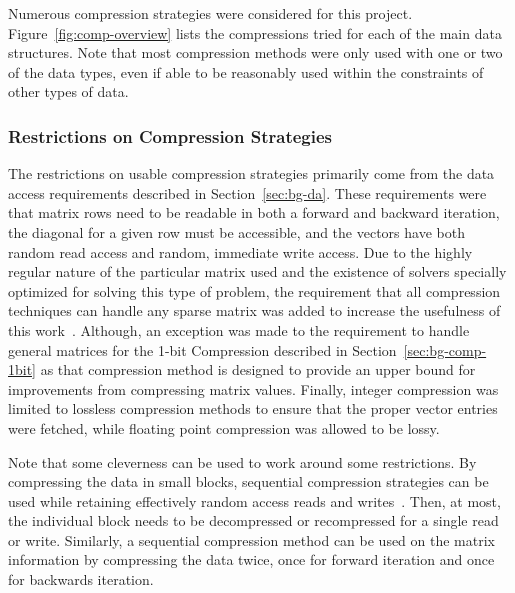 Numerous compression strategies were considered for this project.
Figure~\ref{fig:comp-overview} lists the compressions tried for each of the main data structures.
Note that most compression methods were only used with one or two of the data types, even if able to be reasonably used within the constraints of other types of data.



\subsubsection{Restrictions on Compression Strategies}
The restrictions on usable compression strategies primarily come from the data access requirements described in Section~\ref{sec:bg-da}.
These requirements were that matrix rows need to be readable in both a forward and backward iteration, the diagonal for a given row must be accessible, and the vectors have both random read access and random, immediate write access.
Due to the highly regular nature of the particular matrix used and the existence of solvers specially optimized for solving this type of problem, the requirement that all compression techniques can handle any sparse matrix was added to increase the usefulness of this work~\cite{Saad:2003:IterativeMethods}.
Although, an exception was made to the requirement to handle general matrices for the 1-bit Compression described in Section~\ref{sec:bg-comp-1bit} as that compression method is designed to provide an upper bound for improvements from compressing matrix values.
Finally, integer compression was limited to lossless compression methods to ensure that the proper vector entries were fetched, while floating point compression was allowed to be lossy.

Note that some cleverness can be used to work around some restrictions.
By compressing the data in small blocks, sequential compression strategies can be used while retaining effectively random access reads and writes~\cite{Lindstrom:2014:zfp}.
Then, at most, the individual block needs to be decompressed or recompressed for a single read or write.
Similarly, a sequential compression method can be used on the matrix information by compressing the data twice, once for forward iteration and once for backwards iteration.


